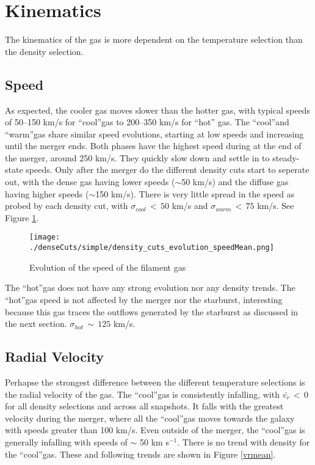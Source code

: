 \documentclass{article}
\newcommand{\cool}{``cool''}
\newcommand{\warm}{``warm''}
\newcommand{\hot}{``hot''}
\newcommand{\kms}{km s$^{-1}$}
\begin{document}
\section{Kinematics}
The kinematics of the gas is more dependent on the temperature selection than the
density selection. 

\subsection{Speed}
As expected, the cooler gas moves slower than the hotter gas,
with typical speeds of 50--150 km/s for \cool gas to 200--350 km/s for \hot
gas. The \cool and \warm gas share similar speed evolutions, starting at low
speeds and increasing until the merger ends. Both phases have the highest speed
during at the end of the merger, around 250 km/s. They quickly slow down and
settle in to steady-state speeds. Only after the merger do the different density
cuts start to seperate out, with the dense gas having lower speeds ($\sim$50
km/s) and the diffuse gas having higher speeds ($\sim$150 km/s). There is very
little spread in the speed as probed by each density cut, with
$\sigma_{cool}\,<\,50$ km/s and $\sigma_{warm}\,<\,75$ km/s. See Figure
\ref{speedMean}.

\begin{figure}[h!]
\centering
\texttt{[image: ./denseCuts/simple/density\_cuts\_evolution\_speedMean.png]}
\caption{Evolution of the speed of the filament gas}
\label{speedMean}
\end{figure}

The \hot gas
does not have any strong evolution nor any density trends. The \hot gas speed is
not affected by the merger nor the starburst, interesting because this gas traces
the outflows generated by the starburst as discussed in the next section. 
$\sigma_{hot}\,\sim\,125$ km/s.


\subsection{Radial Velocity}
Perhapse the strongest difference between the different temperature selections is
the radial velocity of the gas. The \cool gas is consistently infalling, with
$\bar{v_{r}}\,<\,0$ for all density selections and across all snapshots. It falls
with the greatest velocity during the merger, where all the \cool gas moves
towards the galaxy with speeds greater than 100 km/s. Even outside of the merger,
the \cool gas is generally infalling with speeds of $\sim$ 50 \kms. There is no
trend with density for the \cool gas. These and following trends are shown in
Figure \ref{vrmean}.
\end{document}
